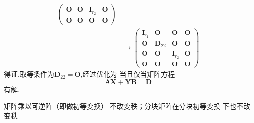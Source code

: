 \begin{formal}
\begin{Proof}
\begin{align*}
\begin{pmatrix}
    \bm{O}&\bm{O}&\bm{I}_{r_2}&\bm{O}\\
    \bm{O}&\bm{O}&\bm{O}&\bm{O}
\end{pmatrix}\\
&\longrightarrow
\begin{pmatrix}
    \bm{I}_{r_1}&\bm{O}&\bm{O}&\bm{O}\\
    \bm{O}&\bm{D}_{22}&\bm{O}&\bm{O}\\
    \bm{O}&\bm{O}&\bm{I}_{r_2}&\bm{O}\\
    \bm{O}&\bm{O}&\bm{O}&\bm{O}
\end{pmatrix}
\end{align*}
得证.取等条件为$\bm{D}_{22}=\bm{O}$,经过优化为
当且仅当矩阵方程
\[
\bm{AX}+\bm{YB}=\bm{D}
\]
有解.
\end{Proof}
\end{formal}
\newpage
\begin{formal}
\begin{theorem}[秩与初等变换]\label{thm:秩与初等变换}
矩阵乘以可逆阵（即做初等变换）
不改变秩；分块矩阵在分块初等变换
下也不改变秩
\end{theorem}
\end{formal}
